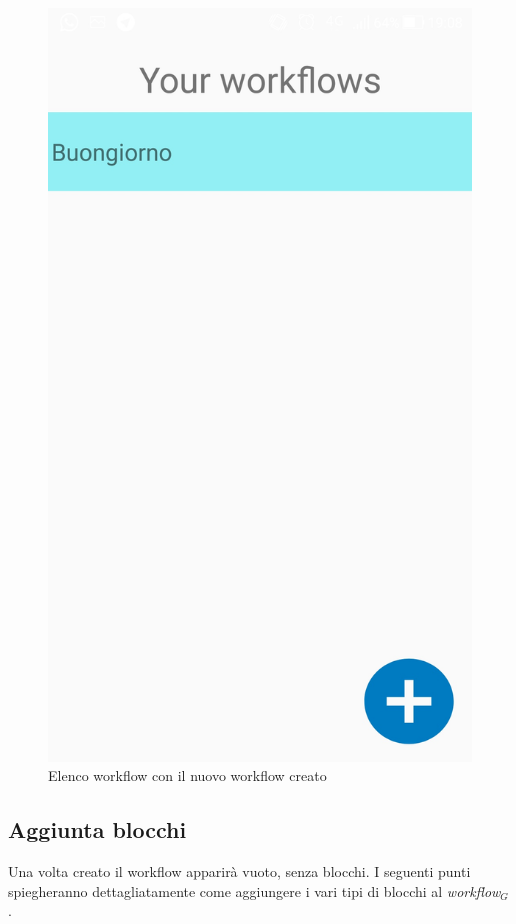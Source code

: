 \begin{enumerate}
\begin{figure}[!ht]
	\centering
	\includegraphics[scale=0.2]{images/HomeWorkflow.jpg}
	\caption{Elenco workflow con il nuovo workflow creato}
\end{figure}
\end{enumerate}
\newpage
\subsection{Aggiunta blocchi}
Una volta creato il workflow apparirà vuoto, senza blocchi.
I seguenti punti spiegheranno dettagliatamente come aggiungere i vari tipi di blocchi al \textit{workflow$_{G}$}.

